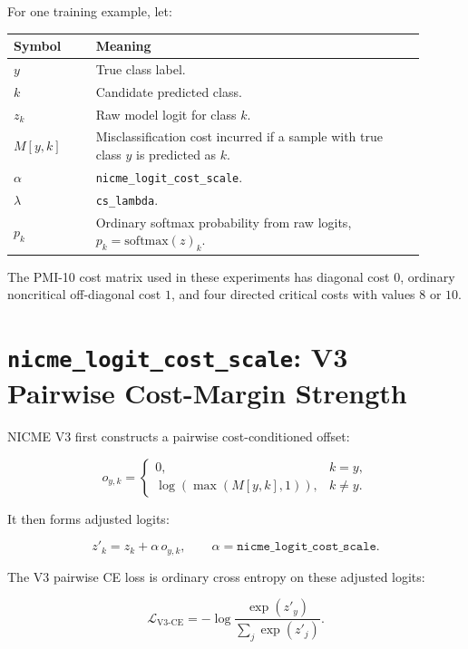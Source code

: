 \documentclass[11pt]{article}
\newcommand{\code}[1]{\texttt{#1}}
\begin{document}
For one training example, let:

\begin{center}
\begin{tabular}{>{\raggedright\arraybackslash}p{0.18\linewidth} p{0.72\linewidth}}
\toprule
Symbol & Meaning \\
\midrule
$y$ & True class label. \\
$k$ & Candidate predicted class. \\
$z_k$ & Raw model logit for class $k$. \\
$M[y,k]$ & Misclassification cost incurred if a sample with true class $y$ is predicted as $k$. \\
$\alpha$ & \code{nicme\_logit\_cost\_scale}. \\
$\lambda$ & \code{cs\_lambda}. \\
$p_k$ & Ordinary softmax probability from raw logits, $p_k=\mathrm{softmax}(z)_k$. \\
\bottomrule
\end{tabular}
\end{center}

The PMI-10 cost matrix used in these experiments has diagonal cost $0$, ordinary noncritical off-diagonal cost $1$, and four directed critical costs with values $8$ or $10$.

\section{\code{nicme\_logit\_cost\_scale}: V3 Pairwise Cost-Margin Strength}

NICME V3 first constructs a pairwise cost-conditioned offset:

\begin{equation}
o_{y,k} =
\begin{cases}
0, & k=y,\\
\log\left(\max(M[y,k], 1)\right), & k \neq y.
\end{cases}
\end{equation}

It then forms adjusted logits:

\begin{equation}
z'_k = z_k + \alpha \, o_{y,k},
\qquad
\alpha = \code{nicme\_logit\_cost\_scale}.
\end{equation}

The V3 pairwise CE loss is ordinary cross entropy on these adjusted logits:

\begin{equation}
\mathcal{L}_{\mathrm{V3\text{-}CE}}
=
-\log
\frac{\exp(z'_y)}
{\sum_j \exp(z'_j)}.
\end{equation}
\end{document}
